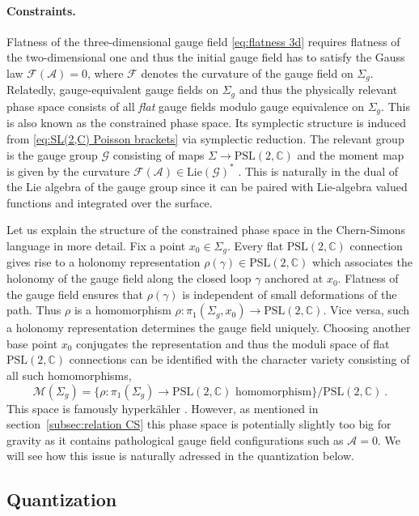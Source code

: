 \documentclass[12pt,a4paper]{article}
\newcommand{\be}{\begin{equation}}
\newcommand{\ee}{\end{equation}}
\newcommand\PSL{\text{PSL}}
\newcommand\CC{\mathbb{C}}
\begin{document}
\paragraph{Constraints.} Flatness of the three-dimensional gauge field \eqref{eq:flatness 3d} requires flatness of the two-dimensional one and thus the initial gauge field has to satisfy the Gauss law $\mathcal{F}(\mathcal{A})=0$, where $\mathcal{F}$ denotes the curvature of the gauge field on $\Sigma_g$. Relatedly, gauge-equivalent gauge fields on $\Sigma_g$ and thus the physically relevant phase space consists of all \emph{flat} gauge fields modulo gauge equivalence on $\Sigma_g$. This is also known as the constrained phase space. Its symplectic structure is induced from \eqref{eq:SL(2,C) Poisson brackets} via symplectic reduction. The relevant group is the gauge group $\mathcal{G}$ consisting of maps $\Sigma \to \PSL(2,\CC)$ and the moment map is given by the curvature $\mathcal{F}(\mathcal{A}) \in \text{Lie}(\mathcal{G})^*$ \cite{AtiyahBott}. This is naturally in the dual of the Lie algebra of the gauge group since it can be paired with Lie-algebra valued functions and integrated over the surface.

Let us explain the structure of the constrained phase space in the Chern-Simons language in more detail. Fix a point $x_0 \in \Sigma_g$.
Every flat $\PSL(2,\CC)$ connection gives rise to a holonomy representation $\rho(\gamma) \in \PSL(2,\CC)$ which associates the holonomy of the gauge field along the closed loop $\gamma$ anchored at $x_0$. Flatness of the gauge field ensures that $\rho(\gamma)$ is independent of small deformations of the path. Thus $\rho$ is a homomorphism $\rho: \pi_1(\Sigma_g,x_0) \longrightarrow \PSL(2,\CC)$. Vice versa, such a holonomy representation determines the gauge field uniquely. Choosing another base point $x_0$ conjugates the representation and thus the moduli space of flat $\PSL(2,\CC)$ connections can be identified with the character variety consisting of all such homomorphisms,
\be 
\mathcal{M}(\Sigma_g)=\big\{ \rho: \pi_1(\Sigma_g) \longrightarrow \PSL(2,\CC) \text{ homomorphism} \big\} / \PSL(2,\CC)~. \label{eq:character variety}
\ee
This space is famously hyperk\"ahler \cite{Hitchin:1986vp}.
However, as mentioned in section~\ref{subsec:relation CS} this phase space is potentially slightly too big for gravity as it contains pathological gauge field configurations such as $\mathcal{A}=0$. We will see how this issue is naturally adressed in the quantization below.


\subsection{Quantization}
\end{document}
